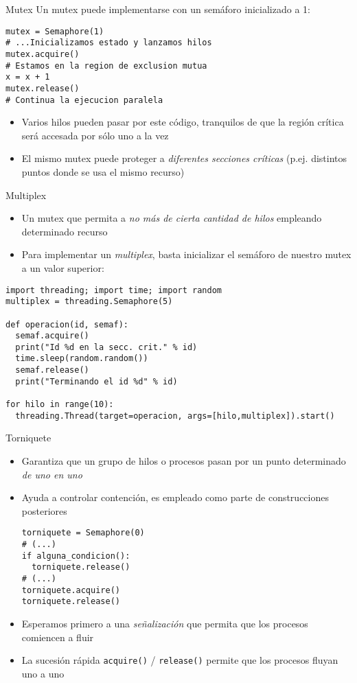 \documentclass[presentation]{beamer}
\begin{document}
\begin{frame}[label={sec:org1ec4415},fragile]{Mutex}
 Un mutex puede implementarse con un semáforo inicializado a 1:
\begin{verbatim}
mutex = Semaphore(1)
# ...Inicializamos estado y lanzamos hilos
mutex.acquire()
# Estamos en la region de exclusion mutua
x = x + 1
mutex.release()
# Continua la ejecucion paralela
\end{verbatim}
\begin{itemize}
\item Varios hilos pueden pasar por este código, tranquilos de que la
región crítica será accesada por sólo uno a la vez
\item El mismo mutex puede proteger a \emph{diferentes secciones críticas}
(p.ej. distintos puntos donde se usa el mismo recurso)
\end{itemize}
\end{frame}
\begin{frame}[label={sec:org487e438},fragile]{Multiplex}
 \begin{itemize}
\item Un mutex que permita a \emph{no más de cierta cantidad de hilos}
empleando determinado recurso
\item Para implementar un \emph{multiplex}, basta inicializar el semáforo de
nuestro mutex a un valor superior:
\end{itemize}
\begin{verbatim}
import threading; import time; import random
multiplex = threading.Semaphore(5)

def operacion(id, semaf):
  semaf.acquire()
  print("Id %d en la secc. crit." % id)
  time.sleep(random.random())
  semaf.release()
  print("Terminando el id %d" % id)

for hilo in range(10):
  threading.Thread(target=operacion, args=[hilo,multiplex]).start()
\end{verbatim}
\end{frame}
\begin{frame}[label={sec:org386d9a7},fragile]{Torniquete}
 \begin{itemize}
\item Garantiza que un grupo de hilos o procesos pasan por un punto
determinado \emph{de uno en uno}
\item Ayuda a controlar contención, es empleado como parte de
construcciones posteriores
\begin{verbatim}
torniquete = Semaphore(0)
# (...)
if alguna_condicion():
  torniquete.release()
# (...)
torniquete.acquire()
torniquete.release()
\end{verbatim}
\item Esperamos primero a una \emph{señalización} que permita que los procesos
comiencen a fluir
\item La sucesión rápida \texttt{acquire()} / \texttt{release()} permite que los
procesos fluyan uno a uno
\end{itemize}
\end{frame}
\end{document}
